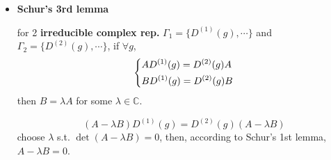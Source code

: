 \begin{itemize}
	\item \textbf{Schur's 3rd lemma}
	
	for 2 \textbf{irreducible complex rep.} $\Gamma_1 = \{D^{(1)}(g), \cdots\}$ and $\Gamma_2 = \{D^{(2)}(g), \cdots\}$, if $\forall g$,
	\begin{equation}
		\begin{dcases}
			A D^{(1)}(g) = D^{(2)}(g) A \\
			B D^{(1)}(g) = D^{(2)}(g) B
		\end{dcases}
	\end{equation}
	then $B = \lambda A$ for some $\lambda \in \mathbb{C}$.
	
	\begin{tcolorbox}[title=proof:]
		\begin{equation}
			(A - \lambda B) D^{(1)}(g) = D^{(2)}(g) (A - \lambda B)
		\end{equation}
		choose $\lambda$ s.t. $\det(A - \lambda B) = 0$, then, according to Schur's 1st lemma, $A - \lambda B = 0$.
	\end{tcolorbox}
\end{itemize}

